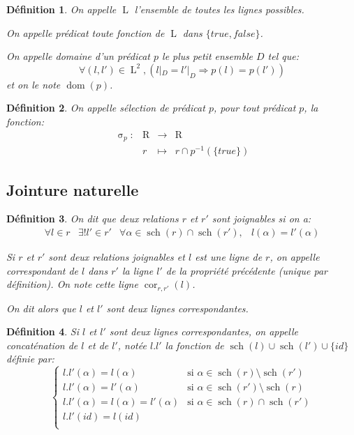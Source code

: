 \documentclass[french]{article}
\DeclareMathOperator{\sel}{\sigma}
\DeclareMathOperator{\dom}{dom}
\DeclareMathOperator{\R}{R}
\DeclareMathOperator{\s}{sch}
\DeclareMathOperator{\ls}{L}
\DeclareMathOperator{\cor}{cor}
\newcommand{\selP}{\sel_p}
\newtheorem{defi}{Définition}
\begin{document}
\begin{defi}
	On appelle $\ls$ l'ensemble de toutes les lignes possibles.
	
	On appelle \emph{prédicat} toute fonction
	de $\ls$ dans $\{true, false\}$.
	
	On appelle \emph{domaine} d'un prédicat $p$ le plus petit
	ensemble $D$ tel que:
	$$
	\forall (l, l') \in \ls^2, (l|_D = l'|_D \Rightarrow  p(l) = p(l')) 
	$$
	et on le note $\dom(p)$.
\end{defi}

\begin{defi}
	On appelle \emph{sélection de prédicat $p$}, pour tout prédicat $p$, la fonction:
	$$
	\begin{array}{llcl}
	\selP: 	& \R 	& \rightarrow 	& \R \\
			& r		& \mapsto		& r \cap p^{-1}(\{true\})
	\end{array}
	$$
\end{defi}

\subsection*{Jointure naturelle}
\begin{defi}
	On dit que \emph{deux relations} $r$ et $r'$
	sont \emph{joignables} si on a:
	$$
	\begin{array}{lllr}
	\forall l \in r &
	\exists! l' \in r' &
	\forall \alpha \in \s(r) \cap \s(r'), &
	l(\alpha) = l'(\alpha)
	\end{array}
	$$
	
	Si $r$ et $r'$ sont deux relations joignables
	et $l$ est une ligne de $r$,
	on appelle \emph{correspondant de $l$ dans
	$r'$} la ligne $l'$ de la propriété précédente
	(unique par définition).
	On note cette ligne $\cor_{r, r'}(l)$.
	
	On dit alors que $l$ et $l'$ sont
	\emph{deux lignes correspondantes}.
\end{defi}

\begin{defi}
	Si $l$ et $l'$ sont deux lignes correspondantes,
	on appelle \emph{concaténation de $l$ et de $l'$},
	notée $l.l'$ la fonction de $\s(l) \cup \s(l') \cup \{id\}$
	définie par:
	$$
	\left\lbrace
	\begin{array}{ll}
	l.l'(\alpha)  = l(\alpha) & \text{si $\alpha \in \s(r) \setminus \s(r')$} \\
	l.l'(\alpha)  = l'(\alpha) & \text{si $\alpha \in \s(r') \setminus \s(r)$} \\
	l.l'(\alpha)  = l(\alpha) = l'(\alpha) & \text{si $\alpha \in \s(r) \cap \s(r')$} \\
	l.l'(id)  = l(id) &  \\
	\end{array}
	\right.
	$$
\end{defi}
\end{document}

